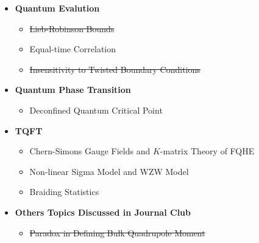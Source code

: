 \documentclass[10pt,nofootinbib]{revtex4}
\begin{document}
\begin{itemize}[label=$\circ$]
	\item {\bf Quantum Evalution}
		\begin{itemize}[label=$\star$]
			\item \sout{Lieb-Robinson Bounds \mbox{\cite{lieb1972finite,Halstings2010locality}}}
			\item Equal-time Correlation \cite{hastings2004locality}
			\item \sout{Insensitivity to Twisted Boundary Conditions \mbox{\cite{watanabe2018insensitivity}}}
		\end{itemize}
	\item {\bf Quantum Phase Transition}
		\begin{itemize}[label=$\star$]
			\item Deconfined Quantum Critical Point \cite{senthil2004deconfined,sandvik2007evidence}
		\end{itemize}
	\item {\bf TQFT}
		\begin{itemize}[label=$\star$]
			\item Chern-Simons Gauge Fields and $K$-matrix Theory of FQHE \cite{FradkinTQFT,wen2004quantum}
			\item Non-linear Sigma Model and WZW Model \cite{tsvelik2007quantum,fradkin2013field}
			\item Braiding Statistics \cite{FradkinTQFT,wilczek1990fractional}
		\end{itemize}
	\item {\bf Others Topics Discussed in Journal Club}
		\begin{itemize}[label=$\star$]
			\item \sout{Paradox in Defining Bulk Quadrupole Moment \mbox{\cite{ono2019difficulties}}}
		\end{itemize}
\end{itemize}


\end{document}
